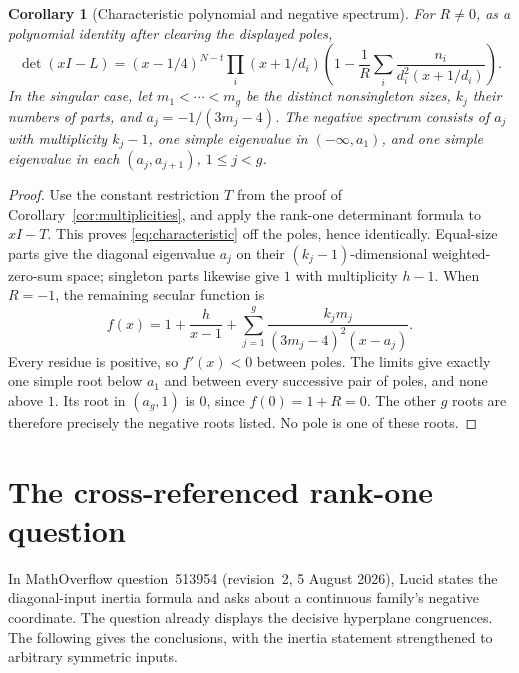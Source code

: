 \documentclass[11pt]{article}
\newtheorem{corollary}[theorem]{Corollary}
\begin{document}
\begin{corollary}[Characteristic polynomial and negative spectrum]\label{cor:polynomial}
For $R\ne0$, as a polynomial identity after clearing the displayed poles,
\begin{equation}\label{eq:characteristic}
 \det(xI-L)=(x-1/4)^{N-t}\prod_i(x+1/d_i)
 \left(1-\frac1R\sum_i\frac{n_i}{d_i^2(x+1/d_i)}\right).
\end{equation}
In the singular case, let $m_1<\cdots<m_g$ be the distinct
nonsingleton sizes, $k_j$ their numbers of parts, and
$a_j=-1/(3m_j-4)$. The negative spectrum consists of
$a_j$ with multiplicity $k_j-1$, one simple eigenvalue in
$(-\infty,a_1)$, and one simple eigenvalue in each
$(a_j,a_{j+1})$, $1\le j<g$.
\end{corollary}
\begin{proof}
Use the constant restriction $T$ from the proof of
Corollary~\ref{cor:multiplicities}, and apply the rank-one determinant
formula to $xI-T$. This proves \eqref{eq:characteristic} off the poles,
hence identically. Equal-size parts give the diagonal eigenvalue $a_j$
on their $(k_j-1)$-dimensional weighted-zero-sum space; singleton parts
likewise give $1$ with multiplicity $h-1$.
When $R=-1$, the remaining secular function is
\[
 f(x)=1+\frac{h}{x-1}+
 \sum_{j=1}^g\frac{k_jm_j}{(3m_j-4)^2(x-a_j)}.
\]
Every residue is positive, so $f'(x)<0$ between poles.
The limits give exactly one simple root below $a_1$ and between every
successive pair of poles, and none above $1$. Its root in $(a_g,1)$ is
$0$, since $f(0)=1+R=0$. The other $g$ roots are therefore precisely
the negative roots listed. No pole is one of these roots.
\end{proof}

\section{The cross-referenced rank-one question}\label{sec:family}
In MathOverflow question~513954 (revision~2, 5 August 2026), Lucid
\cite{Lucid} states the diagonal-input inertia formula and asks about a
continuous family's negative coordinate. The question already displays
the decisive hyperplane congruences. The following gives the conclusions,
with the inertia statement strengthened to arbitrary symmetric inputs.
\end{document}
